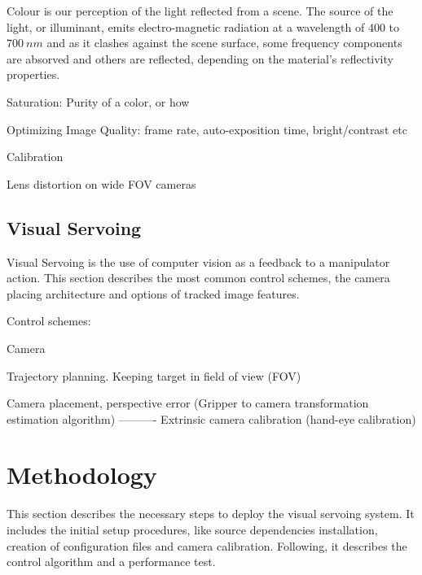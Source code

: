 \documentclass[11pt]{article}
\begin{document}
        Colour is our perception of the light reflected from a scene. The source of the light, or illuminant, emits electro-magnetic radiation at a wavelength of $ 400 $ to $ 700\ nm $ and as it clashes against the scene surface, some frequency components are absorved and others are reflected, depending on the material's reflectivity properties.
        
        Saturation: Purity of a color, or how 
        
        
        
        
        Optimizing Image Quality: frame rate, auto-exposition time, bright/contrast etc
        
        Calibration
        
        Lens distortion on wide FOV cameras
    
    \subsection{Visual Servoing}
        Visual Servoing is the use of computer vision as a feedback to a manipulator action. This section describes the most common control schemes, the camera placing architecture and options of tracked image features.
        
        Control schemes: 
        
        Camera 
    
        Trajectory planning. Keeping target in field of view (FOV)
        
        Camera placement, perspective error (Gripper to camera transformation estimation algorithm) ---------- Extrinsic camera calibration (hand-eye calibration)


\section{Methodology}
    This section describes the necessary steps to deploy the visual servoing system. It includes the initial setup procedures, like source dependencies installation, creation of configuration files and camera calibration. Following, it describes the control algorithm and a performance test. 
    
\end{document}
